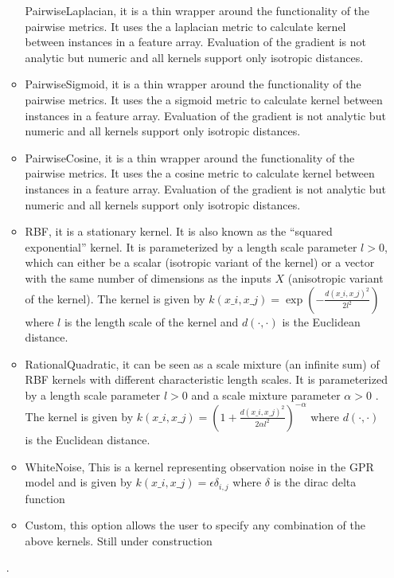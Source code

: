 \begin{itemize}
\begin{itemize}
      PairwiseLaplacian, it is a thin wrapper around the functionality of the pairwise metrics. It
      uses the a laplacian metric to calculate kernel between instances
      in a feature array. Evaluation of the gradient is not analytic but numeric and all kernels
      support only isotropic distances.                                                    \item
      PairwiseSigmoid, it is a thin wrapper around the functionality of the pairwise metrics. It
      uses the a sigmoid metric to calculate kernel between instances
      in a feature array. Evaluation of the gradient is not analytic but numeric and all kernels
      support only isotropic distances.                                                    \item
      PairwiseCosine, it is a thin wrapper around the functionality of the pairwise metrics. It uses
      the a cosine metric to calculate kernel between instances
      in a feature array. Evaluation of the gradient is not analytic but numeric and all kernels
      support only isotropic distances.                                                    \item
      RBF, it is a stationary kernel. It is also known as the ``squared exponential'' kernel. It is
      parameterized by a length scale parameter $l>0$,
      which can either be a scalar (isotropic variant of the kernel) or a vector with the same
      number of dimensions as the inputs $X$ (anisotropic variant of the kernel).
      The kernel is given by $k(x\_i, x\_j) = \exp\left(- \frac{d(x\_i, x\_j)^2}{2l^2} \right)$ where
      $l$ is the length scale of the kernel and $d(\cdot,\cdot)$ is the Euclidean distance.
      \item RationalQuadratic, it can be seen as a scale mixture (an infinite sum) of RBF kernels
      with different characteristic length scales. It is parameterized by a length scale parameter
      $l>0$ and a scale mixture parameter $\alpha>0$ . The kernel is given by $k(x\_i, x\_j) = \left(1
      + \frac{d(x\_i, x\_j)^2 }{ 2\alpha  l^2}\right)^{-\alpha}$ where
      $d(\cdot,\cdot)$ is the Euclidean distance.
      \item WhiteNoise, This is a kernel representing observation noise in the GPR model and is
      given by $k(x\_i, x\_j) = \epsilon\delta_{i,j}$
      where $\delta$ is the dirac delta function
      \item Custom, this option allows the user to specify any combination of the above kernels.
      Still under construction                                                  \end{itemize}.


\end{itemize}
